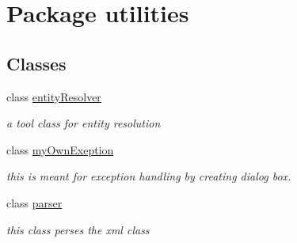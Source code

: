 \hypertarget{namespaceutilities}{}\section{Package utilities}
\label{namespaceutilities}
\subsection*{Classes}
\begin{DoxyCompactItemize}
\item 
class \hyperlink{classutilities_1_1entity_resolver}{entity\+Resolver}
\begin{DoxyCompactList}\small\item\em a tool class for entity resolution \end{DoxyCompactList}\item 
class \hyperlink{classutilities_1_1my_own_exeption}{my\+Own\+Exeption}
\begin{DoxyCompactList}\small\item\em this is meant for exception handling by creating dialog box. \end{DoxyCompactList}\item 
class \hyperlink{classutilities_1_1parser}{parser}
\begin{DoxyCompactList}\small\item\em this class perses the xml class \end{DoxyCompactList}\end{DoxyCompactItemize}
